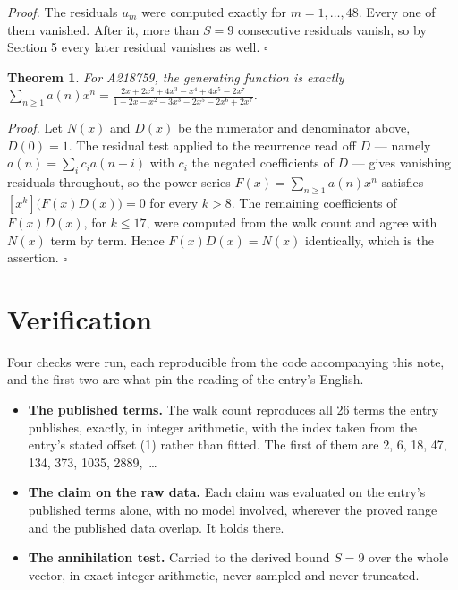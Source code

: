 \documentclass[11pt]{article}
\newtheorem{theorem}{Theorem}
\theoremstyle{definition}
\begin{document}
{\itshape Proof.} The residuals $u_m$ were computed exactly for $m = 1,\dots,48$. Every one of them vanished. After it, more than $S = 9$ consecutive residuals vanish, so by Section 5 every later residual vanishes as well. $\square$

\begin{theorem} For A218759, the generating function is exactly $\sum_{n\ge 1} a(n)x^n = \frac{2x + 2x^{2} + 4x^{3} - x^{4} + 4x^{5} - 2x^{7}}{1 - 2x - x^{2} - 3x^{3} - 2x^{5} - 2x^{6} + 2x^{7}}$.\end{theorem}

{\itshape Proof.} Let $N(x)$ and $D(x)$ be the numerator and denominator above, $D(0)=1$. The residual test applied to the recurrence read off $D$ --- namely $a(n) = \sum_i c_i a(n-i)$ with $c_i$ the negated coefficients of $D$ --- gives vanishing residuals throughout, so the power series $F(x)=\sum_{n\ge 1}a(n)x^n$ satisfies $[x^k]\bigl(F(x)D(x)\bigr) = 0$ for every $k > 8$. The remaining coefficients of $F(x)D(x)$, for $k \le 17$, were computed from the walk count and agree with $N(x)$ term by term. Hence $F(x)D(x) = N(x)$ identically, which is the assertion. $\square$

\section{Verification}

Four checks were run, each reproducible from the code accompanying this note, and the first two are what pin the reading of the entry's English.

\begin{itemize}

\item {\bfseries The published terms.} The walk count reproduces all 26 terms the entry publishes, exactly, in integer arithmetic, with the index taken from the entry's stated offset (1) rather than fitted. The first of them are 2, 6, 18, 47, 134, 373, 1035, 2889,~\dots

\item {\bfseries The claim on the raw data.} Each claim was evaluated on the entry's published terms alone, with no model involved, wherever the proved range and the published data overlap. It holds there.

\item {\bfseries The annihilation test.} Carried to the derived bound $S = 9$ over the whole vector, in exact integer arithmetic, never sampled and never truncated.

\end{itemize}
\end{document}
